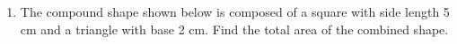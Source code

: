 \documentclass[12pt, twoside]{article}
\begin{document}
\begin{enumerate}
    \item The compound shape shown below is composed of a square with side length 5 cm and a triangle with base 2 cm. Find the total area of the combined shape.
    \vspace{1cm} 
    \begin{flushleft}
    \end{flushleft} \vspace{1cm}  

   
  \end{enumerate}
\end{document}
